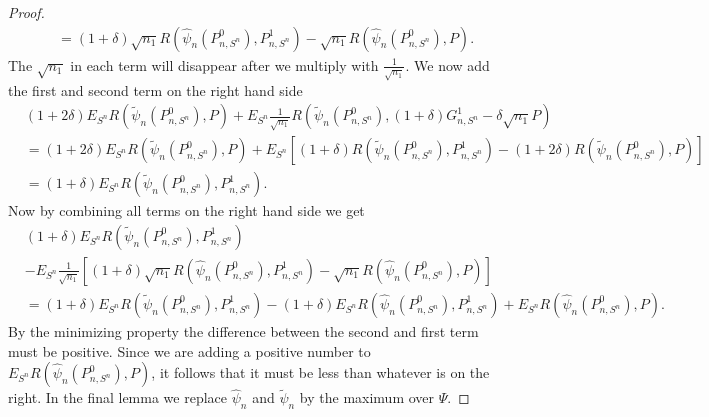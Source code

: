 \documentclass[11pt, a4paper]{article}
\theoremstyle{definition}
\theoremstyle{remark}
\newcommand{\la}{\psi}
\newcommand{\Sn}{S^n}
\newcommand{\lib}{\Psi}
\begin{document}
\begin{proof}
\begin{align*}
       &=(1 + \delta) \sqrt{n_1} R(\hat{\la}_n (P_{n, \Sn}^{0}), P_{n,\Sn}^{1}) - \sqrt{n_1}   R(\hat{\la}_n (P_{n, \Sn}^{0}), P).
  \end{align*}
  The $ \sqrt{n_1} $ in each term will disappear after we multiply with $ \frac{1}{\sqrt{n_1}} $. We now add the first and second term on the right hand side 
  \begin{align*}
      &(1 + 2 \delta) E_{\Sn} R( \tilde{\la}_n(P_{n, \Sn}^{0}) , P ) +E_{\Sn} \frac{1}{\sqrt{n_1} } R(\tilde{\la}_n (P_{n, \Sn}^{0}), (1 + \delta) G_{n,\Sn}^{1} - \delta \sqrt{n_1} P)\\ 
      &= (1 + 2 \delta) E_{\Sn} R( \tilde{\la}_n(P_{n, \Sn}^{0}) , P ) + E_{\Sn} \left[(1 + \delta) R(\tilde{\la}_n (P_{n, \Sn}^{0}), P_{n,\Sn}^{1}) - (1 + 2\delta)R(\tilde{\la}_n (P_{n, \Sn}^{0}), P) \right]\\
      &=(1 + \delta) E_{\Sn} R(\tilde{\la}_n (P_{n, \Sn}^{0}), P_{n,\Sn}^{1}).
  \end{align*}
Now by combining all terms on the right hand side we get
\begin{align*}
    &(1 + \delta) E_{\Sn} R(\tilde{\la}_n (P_{n, \Sn}^{0}), P_{n,\Sn}^{1})\\
    &-E_{\Sn} \frac{1}{\sqrt{n_1} } \left[ (1 + \delta) \sqrt{n_1} R(\hat{\la}_n (P_{n, \Sn}^{0}), P_{n,\Sn}^{1}) - \sqrt{n_1}   R(\hat{\la}_n (P_{n, \Sn}^{0}), P) \right] \\
    &= (1 + \delta) E_{\Sn} R(\tilde{\la}_n (P_{n, \Sn}^{0}), P_{n,\Sn}^{1})- (1 + \delta)E_{\Sn}R(\hat{\la}_n (P_{n, \Sn}^{0}), P_{n,\Sn}^{1})+ E_{\Sn} R(\hat{\la}_n (P_{n, \Sn}^{0}), P).
\end{align*}
By the minimizing property the difference between the second and first term must be positive. Since we are adding a positive number to $ E_{\Sn} R(\hat{\la}_n (P_{n, \Sn}^{0}), P) $, it follows that it must be less than whatever is on the right. In the final lemma we replace $ \hat{\la}_n  $ and $ \tilde{\la}_n  $ by the maximum over $ \lib $.  
  
\end{proof}


\newpage
\printbibliography
\end{document}
